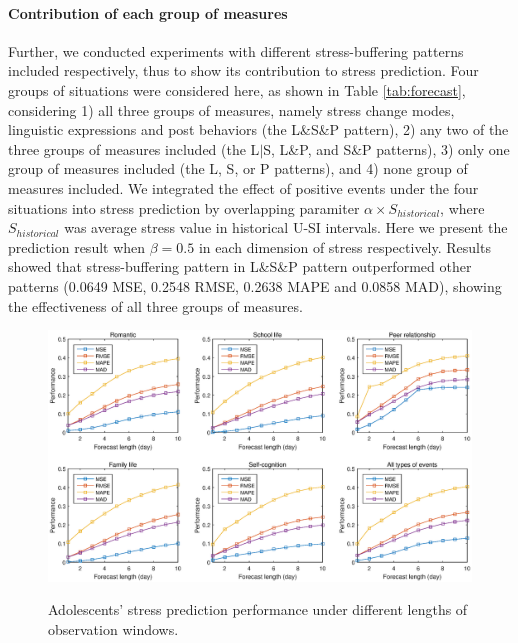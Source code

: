 \paragraph{Contribution of each group of measures}
Further,
we conducted experiments with different stress-buffering patterns included respectively,
thus to show its contribution to stress prediction.
Four groups of situations were considered here, as shown in Table \ref{tab:forecast},
considering
1) all three groups of measures, namely stress change modes, linguistic expressions and post behaviors (the L\&S\&P pattern),
2) any two of the three groups of measures included (the L$|$S, L\&P, and S\&P patterns),
3) only one group of measures included (the L, S, or P patterns),
and 4) none group of measures included.
We integrated the effect of positive events under the four situations into stress prediction by overlapping paramiter $\alpha \times S_{historical}$,
where $S_{historical}$ was average stress value in historical U-SI intervals.
Here we present the prediction result when $\beta = 0.5$ in each dimension of stress respectively.
Results showed that stress-buffering pattern in L\&S\&P pattern outperformed other patterns
(0.0649 MSE, 0.2548 RMSE, 0.2638 MAPE and 0.0858 MAD),
showing the effectiveness of all three groups of measures.
\begin{figure}
\centering
\caption{Adolescents' stress prediction performance under different lengths of observation windows.}
\includegraphics[width=\linewidth]{figs/predictWindow2.eps}
\label{fig:length}
\end{figure}

